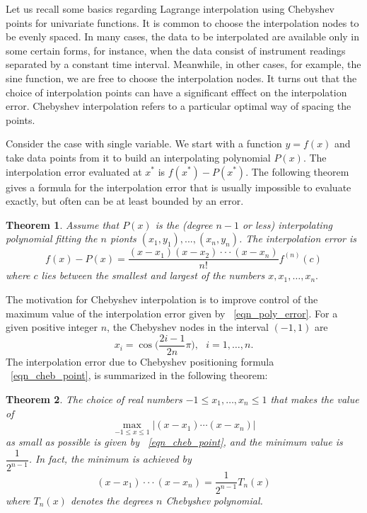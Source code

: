 \documentclass[11pt,reqno]{amsart}
\newtheorem{theorem}{Theorem}%
\theoremstyle{definition}
\begin{document}
Let us recall some basics regarding Lagrange interpolation using Chebyshev
points for univariate functions.  It is common to choose the interpolation nodes 
to be evenly spaced. In many cases, the data to be
interpolated are available only in some certain forms, for instance, when the
data consist of instrument readings separated by a constant time interval.
Meanwhile, in other cases, for example, the sine function, we are free to
choose the interpolation nodes. It turns out that the choice
of interpolation points can have a significant efffect on the interpolation
error. Chebyshev interpolation refers to a particular optimal way of spacing
the points.

Consider the case with single variable. We start with a function $y=f(x)$ and
take data points from it to build an interpolating polynomial $P(x)$. The
interpolation error evaluated at $x^*$ is $f(x^*)-P(x^*)$. The following
theorem gives a formula for the interpolation error that is usually impossible
to evaluate exactly, but often can be at least bounded by an error.

\begin{theorem}
Assume that $P(x)$ is the (degree $n-1$ or less) interpolating polynomial fitting the $n$ pionts $(x_1,y_1),...,(x_n,y_n)$. The interpolation error is 
\begin{equation} \label{eqn_poly_error}
f(x)-P(x)=\frac{(x-x_1)(x-x_2)\cdot\cdot\cdot(x-x_n)}{n!}f^{(n)}(c)
\end{equation}
where $c$ lies between the smallest and largest of the numbers $x,x_1,\ldots,x_n.$
\end{theorem}
The motivation for Chebyshev interpolation is to improve control of the maximum value of the interpolation error given by ~\eqref{eqn_poly_error}. For a given positive integer $n$, the Chebyshev nodes in the interval $(-1,1)$ are
\begin{equation}
\label{eqn_cheb_point}
x_i=\cos\Big(\frac{2i-1}{2n}\pi\Big),\mbox{ }i=1,\ldots,n.
\end{equation}
The interpolation error due to Chebyshev positioning formula ~\eqref{eqn_cheb_point}, is summarized in the following theorem:
\begin{theorem}
The choice of real numbers $-1\le x_1,\ldots,x_n\le 1$ that makes the value of 
\begin{equation}
\max_{-1 \leq x \leq 1}|(x-x_1) \cdots (x-x_n)|
\end{equation}
as small as possible is given by ~\eqref{eqn_cheb_point}, and the minimum value is $\dfrac{1}{2^{n-1}}$. In fact, the minimum is achieved by 
\begin{equation} \label{eqn_cheb_error}
(x-x_1)\cdot\cdot\cdot(x-x_n)=\frac{1}{2^{n-1}}T_n(x)
\end{equation}
where $T_n(x)$ denotes the degrees $n$ Chebyshev polynomial.
\end{theorem}
\end{document}

